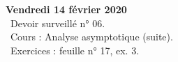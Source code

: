 \documentclass[12pt,a4paper]{article}
\begin{document}
% 
% 
% 
% 
% 
% 
\noindent\textbf{Vendredi 14 février 2020}\\
\bu\ Devoir surveillé n° 06.\\
\bu\ Cours : Analyse asymptotique (suite).\\
\bu\ Exercices : feuille n° 17, ex. 3.\vspace{.4cm}\\
  
\end{document}
